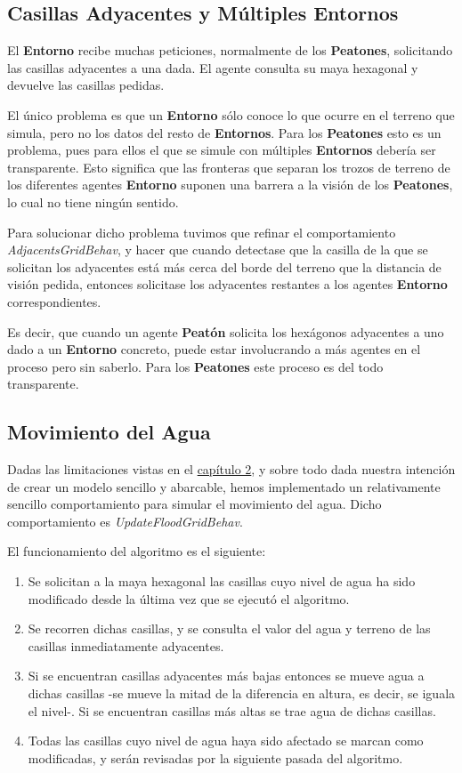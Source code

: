 \subsection*{Casillas Adyacentes y Múltiples Entornos}

El {\bf Entorno} recibe muchas peticiones, normalmente de los {\bf Peatones},
solicitando las casillas adyacentes a una dada. El agente consulta su maya
hexagonal y devuelve las casillas pedidas.

El único problema es que un {\bf Entorno} sólo conoce lo que ocurre en el
terreno que simula, pero no los datos del resto de {\bf Entornos}. Para los
{\bf Peatones} esto es un problema, pues para ellos el que se simule con
múltiples {\bf Entornos} debería ser transparente. Esto significa que las
fronteras que separan los trozos de terreno de los diferentes agentes {\bf
Entorno} suponen una barrera a la visión de los {\bf Peatones}, lo cual no
tiene ningún sentido.

Para solucionar dicho problema tuvimos que refinar el comportamiento {\em
AdjacentsGridBehav}, y hacer que cuando detectase que la casilla de la que se
solicitan los adyacentes está más cerca del borde del terreno que la distancia
de visión pedida, entonces solicitase los adyacentes restantes a los agentes
{\bf Entorno} correspondientes.

Es decir, que cuando un agente {\bf Peatón} solicita los hexágonos adyacentes a
uno dado a un {\bf Entorno} concreto, puede estar involucrando a más agentes en
el proceso pero sin saberlo. Para los {\bf Peatones} este proceso es del todo
transparente.

\subsection*{Movimiento del Agua}\label{waterMovement}

Dadas las limitaciones vistas en el \hyperref[cap2]{capítulo 2}, y sobre todo
dada nuestra intención de crear un modelo sencillo y abarcable, hemos
implementado un relativamente sencillo comportamiento para simular el
movimiento del agua. Dicho comportamiento es {\em UpdateFloodGridBehav}.

El funcionamiento del algoritmo es el siguiente:

\begin{enumerate}
 \item Se solicitan a la maya hexagonal las casillas cuyo nivel de agua ha sido
 modificado desde la última vez que se ejecutó el algoritmo.
 \item Se recorren dichas casillas, y se consulta el valor del agua y terreno
 de las casillas inmediatamente adyacentes.
 \item Si se encuentran casillas adyacentes más bajas entonces se mueve agua a
 dichas casillas -se mueve la mitad de la diferencia en altura, es decir, se
 iguala el nivel-. Si se encuentran casillas más altas se trae agua de dichas
 casillas.
 \item Todas las casillas cuyo nivel de agua haya sido afectado se marcan como
 modificadas, y serán revisadas por la siguiente pasada del algoritmo.
\end{enumerate}

